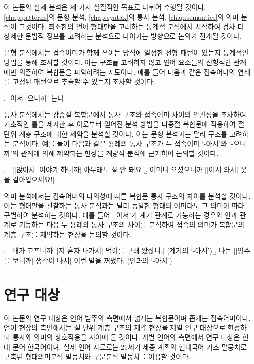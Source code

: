이 논문의 실제 분석은 세 가지 실질적인 목표로 나뉘어 수행될 것이다.
\ref{chap:patterns}의 문형 분석, \ref{chap:syntax}의 통사 분석,
\ref{chap:semantics}의 의미 분석이 그것이다. 최소한의 언어 형태만을 고려하는
통계적 분석에서 시작하여 점차 더 상세한 문법적 정보를 고려하는 분석으로
나아가는 방향으로 논의가 전개될 것이다.


문형 분석에서는 접속어미가 함께 쓰이는 방식에 일정한 선형 패턴이 있는지
통계적인 방법을 통해 조사할 것이다. 이는 구조를 고려하지 않고 언어 요소들의
선형적인 관계에만 의존하여 복합문을 파악하려는 시도이다. 예를 들어 다음과
같은 접속어미의 연쇄를 고정된 패턴으로 추출할 수 있는지 조사할 것이다.

\ex.  -아서 -으니까 -는다 %



통사 분석에서는 삼중절 복합문에서 통사 구조와 접속어미 사이의 연관성을 조사하여
기초적인 틀을 제시한 후 이로부터 얻어진 분석 방법을 다중절 복합문에 적용하여 절
단위 계층 구조에 대한 제약을 분석할 것이다. 이는 문형 분석과는 달리 구조를
고려하는 분석이다. 예를 들어 다음과 같은 용례의 통사 구조가 두 접속어미
`-아서'와 `-으니까'의 관계에 의해 제약되는 현상을 계량적 분석에 근거하여 논의할
것이다.

\ex. %
\a. [[앉아서] 이야기 하니까] 아무래도 잘 안 돼요.
\b. 어머니 오셨으니까 [[어서 와서] 옷을 갈아입으세요!]


의미 분석에서는 접속어미의 다의성에 따른 복합문 통사 구조의 차이를 분석할
것이다. 이는 형태만을 관찰하는 통사 분석과는 달리 동일한 형태의 어미라도 그
의미에 따라 구별하여 분석하는 것이다. 예를 들어 `-아서'가 계기 관계로 기능하는
경우와 인과 관계로 기능하는 다음 두 용례의 통사 구조의 차이를 분석하여 접속의
의미가 복합문의 계층 구조를 제약하는 현상을 논의할 것이다.

\ex.
\a. 배가 고프니까  [[저 혼자 나가서] 먹이를 구해 왔잖니.] (계기의 `-아서')
\b. 나는 [[양주를 보니까] 생각이 나서] 이런 말을 꺼냈다. (인과의 `-아서')


\section{연구 대상}

이 논문의 연구 대상은 언어 범주의 측면에서 넓게는 복합문이며 좁게는
접속어미이다. 언어 현상의 측면에서는 절 단위 계층 구조의 제약 현상을 제일 연구
대상으로 한정하되 통사와 의미의 상호작용을 시야에 둘 것이다. 개별 언어의
측면에서 연구 대상은 현대 문어 한국어이며, 실제 언어 자료로는 21세기 세종
계획의 현대국어 기초 말뭉치로 구축된 형태의미분석 말뭉치와 구문분석 말뭉치를
이용할 것이다.


